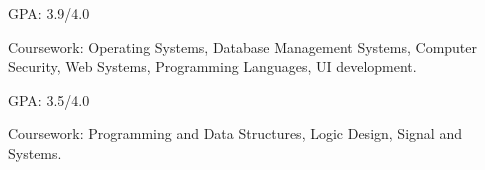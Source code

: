 
\USC
{}

\UM
{}
\begin{miniItemize}
    \item GPA: 3.9/4.0
    \item Coursework: 
        Operating Systems,
        Database Management Systems,
        Computer Security,
        Web Systems,
        Programming Languages,
        UI development.
\end{miniItemize}

\SJTU
{}
\begin{miniItemize}
    \item GPA: 3.5/4.0
    \item Coursework:
        Programming and Data Structures,
        Logic Design,
        Signal and Systems.
\end{miniItemize}
